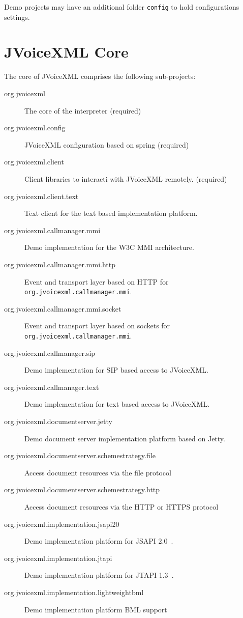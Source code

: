 \documentclass[11pt,a4paper]{article}
\begin{document}
Demo projects may have an additional folder \texttt{config} to hold
configurations settings. 

\section{JVoiceXML Core}
\label{sec:jvoicexml-core}

The core of JVoiceXML comprises the following sub-projects:

\begin{description}
\item[org.jvoicexml] The core of the interpreter (required)
\item[org.jvoicexml.config] JVoiceXML configuration based on spring (required)
\item[org.jvoicexml.client] Client libraries to interacti with JVoiceXML
remotely. (required)
\item[org.jvoicexml.client.text] Text client for the text based
implementation platform.
\item[org.jvoicexml.callmanager.mmi] Demo implementation for the W3C MMI
architecture.
\item[org.jvoicexml.callmanager.mmi.http] Event and transport layer
based on HTTP for \texttt{org.jvoicexml.callmanager.mmi}.
\item[org.jvoicexml.callmanager.mmi.socket] Event and transport layer
based on sockets for \texttt{org.jvoicexml.callmanager.mmi}.
\item[org.jvoicexml.callmanager.sip] Demo implementation for SIP based access to
JVoiceXML.
\item[org.jvoicexml.callmanager.text] Demo implementation for text based access to
JVoiceXML.
\item[org.jvoicexml.documentserver.jetty] Demo document server implementation platform based on Jetty.
\item[org.jvoicexml.documentserver.schemestrategy.file] Access document resources via the file protocol
\item[org.jvoicexml.documentserver.schemestrategy.http] Access document resources via the HTTP or HTTPS protocol
\item[org.jvoicexml.implementation.jsapi20] Demo implementation platform for
JSAPI 2.0~\cite{jcp:jsr113}.
\item[org.jvoicexml.implementation.jtapi] Demo implementation platform for
JTAPI 1.3~\cite{sun:jtapi}.
\item[org.jvoicexml.implementation.lightweightbml] Demo implementation platform BML support

\end{description}
\end{document}
